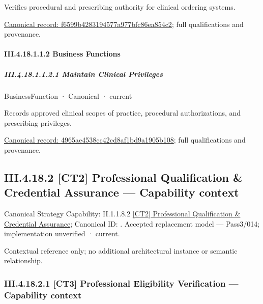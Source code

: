 Verifies procedural and prescribing authority for clinical ordering systems.


{\footnotesize \href{../../../../continuum/business/business-service/f6599b4283194577a977bfc86ea854c2.md}{Canonical record: f6599b4283194577a977bfc86ea854c2}; full qualifications and provenance.}\par
\paragraph*{III.4.18.1.1.2 Business Functions}
\label{navigation:III.4.18.1.1.2}

\subparagraph*{III.4.18.1.1.2.1 Maintain Clinical Privileges}
\label{navigation:III.4.18.1.1.2.1}

\label{element:4965ae4538cc42cd8af1bd9a1905b108}
{\small BusinessFunction · Canonical · current}\par

Records approved clinical scopes of practice, procedural authorizations, and prescribing privileges.


{\footnotesize \href{../../../../continuum/business/business-function/4965ae4538cc42cd8af1bd9a1905b108.md}{Canonical record: 4965ae4538cc42cd8af1bd9a1905b108}; full qualifications and provenance.}\par
\subsection*{III.4.18.2 [CT2] Professional Qualification \& Credential Assurance — Capability context}
\label{navigation:III.4.18.2}

{\small Canonical Strategy Capability: II.1.1.8.2 \hyperref[element:364a54333b644107ba9ae3ecc76ba186]{[CT2] Professional Qualification \& Credential Assurance}; Canonical ID: \texttt{}. Accepted replacement model — Pass3/014; implementation unverified · current.}\par
Contextual reference only; no additional architectural instance or semantic relationship.\par
\subsubsection*{III.4.18.2.1 [CT3] Professional Eligibility Verification — Capability context}
\label{navigation:III.4.18.2.1}


